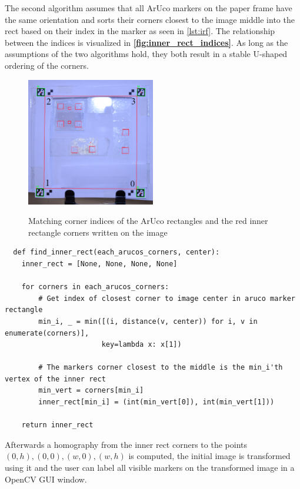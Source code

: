\documentclass[10pt]{book}
\newenvironment{code}{\captionsetup{type=listing}}{}
\newcommand{\figureref}[1]{\textbf{\autoref{#1}}}
\begin{document}
The second algorithm assumes that all \ac{ArUco} markers on the paper frame have the same orientation and sorts their corners closest to the image middle into the rect based on their index in the marker as seen in \autoref{lst:irf}. The relationship between the indices is visualized in \figureref{fig:inner_rect_indices}. As long as the assumptions of the two algorithms hold, they both result in a stable U-shaped ordering of the corners.

\begin{figure}
  \caption{Matching corner indices of the \ac{ArUco} rectangles and the red inner rectangle corners written on the image}
  \includegraphics[width=0.5\textwidth]{image/af_markings_3}
  \label{fig:inner_rect_indices}
\end{figure}

\begin{code}
\label{lst:irf}
\begin{verbatim}
  def find_inner_rect(each_arucos_corners, center):
    inner_rect = [None, None, None, None]

    for corners in each_arucos_corners:
        # Get index of closest corner to image center in aruco marker rectangle
        min_i, _ = min([(i, distance(v, center)) for i, v in enumerate(corners)], 
                       key=lambda x: x[1])
                
        # The markers corner closest to the middle is the min_i'th vertex of the inner rect
        min_vert = corners[min_i]
        inner_rect[min_i] = (int(min_vert[0]), int(min_vert[1]))
        
    return inner_rect
\end{verbatim}
\end{code}

Afterwards a homography from the inner rect corners to the points $(0,h), (0,0), (w,0), (w,h)$ is computed, the initial image is transformed using it and the user can label all visible markers on the transformed image in a \ac{OpenCV} \ac{GUI} window.
\end{document}
